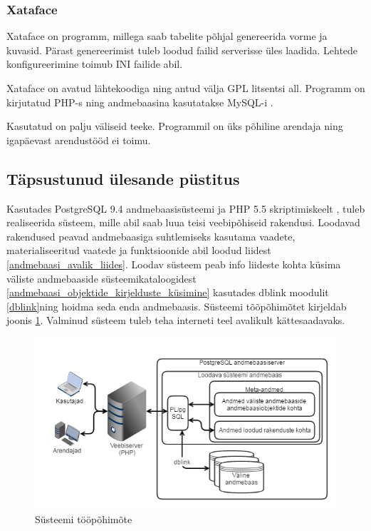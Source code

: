 \documentclass[a4paper,12pt]{article} %
\begin{document}
\subsubsection{Xataface}
Xataface on programm, millega saab tabelite põhjal genereerida vorme ja kuvasid. Pärast genereerimist tuleb loodud failid serverisse üles laadida. Lehtede konfigureerimine toimub INI failide abil.\cite{Xataface}\par
Xataface on avatud lähtekoodiga ning antud välja GPL litsentsi all. Programm on kirjutatud PHP-s \cite{PHP} ning andmebaasina kasutatakse MySQL-i \cite{MySQL}.\par
Kasutatud on palju väliseid teeke. Programmil on üks põhiline arendaja ning igapäevast arendustööd ei toimu. \cite{XatafaceGitHub}
\subsection{Täpsustunud ülesande püstitus}
Kasutades PostgreSQL 9.4 andmebaasisüsteemi \cite{PostgreSQL} ja PHP 5.5 skriptimiskeelt \cite{PHP}, tuleb realiseerida süsteem, mille abil saab luua teisi veebipõhiseid rakendusi. Loodavad rakendused peavad andmebaasiga suhtlemiseks kasutama vaadete, materialiseeritud vaatede ja funktsioonide abil loodud liidest \ref{andmebaasi_avalik_liides}. Loodav süsteem peab info liideste kohta küsima väliste andmebaaside süsteemikataloogidest \ref{andmebaasi_objektide_kirjelduste_küsimine} kasutades dblink moodulit \ref{dblink}ning hoidma seda enda andmebaasis. Süsteemi tõõpõhimõtet kirjeldab joonis \ref{fig_süsteemi_tööpõhimõte}. Valminud süsteem tuleb teha interneti teel avalikult kättesaadavaks.

\begin{figure}[H]
\begin{center}
\includegraphics[bb=0 0 604 342,scale=0.75]{./diagrams/how-should-pgapex-work.png}
\caption{Süsteemi tööpõhimõte}
\label{fig_süsteemi_tööpõhimõte}
\end{center}
\end{figure}
\end{document}

